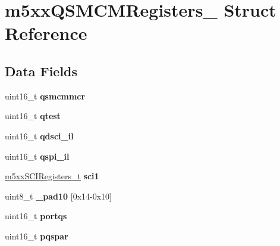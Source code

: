 \hypertarget{structm5xxQSMCMRegisters__}{}\section{m5xx\+Q\+S\+M\+C\+M\+Registers\+\_\+ Struct Reference}
\label{structm5xxQSMCMRegisters__}
\subsection*{Data Fields}
\begin{DoxyCompactItemize}
\item 
\mbox{\label{structm5xxQSMCMRegisters___aede08d30717d86958791e8c10ea90264}} 
uint16\+\_\+t {\bfseries qsmcmmcr}
\item 
\mbox{\label{structm5xxQSMCMRegisters___a847421a30d7379b4993b8673dd20f0d4}} 
uint16\+\_\+t {\bfseries qtest}
\item 
\mbox{\label{structm5xxQSMCMRegisters___a7c1cb4cccfdba5fd7ce4fdf20973b304}} 
uint16\+\_\+t {\bfseries qdsci\+\_\+il}
\item 
\mbox{\label{structm5xxQSMCMRegisters___a6e6b03f504ef6766c825835b2317950c}} 
uint16\+\_\+t {\bfseries qspi\+\_\+il}
\item 
\mbox{\label{structm5xxQSMCMRegisters___a98704c99ddfcad2a2e34f140b4fba8bc}} 
\mbox{\hyperlink{structm5xxSCIRegisters__}{m5xx\+S\+C\+I\+Registers\+\_\+t}} {\bfseries sci1}
\item 
\mbox{\label{structm5xxQSMCMRegisters___a9b6a3aa7d60162482cc8be17a63f9b04}} 
uint8\+\_\+t {\bfseries \+\_\+pad10} \mbox{[}0x14-\/0x10\mbox{]}
\item 
\mbox{\label{structm5xxQSMCMRegisters___a5985adc29a397fac66b9420095cab693}} 
uint16\+\_\+t {\bfseries portqs}
\item 
\mbox{\label{structm5xxQSMCMRegisters___ac52f4d044c10417379266ac0e044ef6d}} 
uint16\+\_\+t {\bfseries pqspar}
\item 

\end{DoxyCompactItemize}

